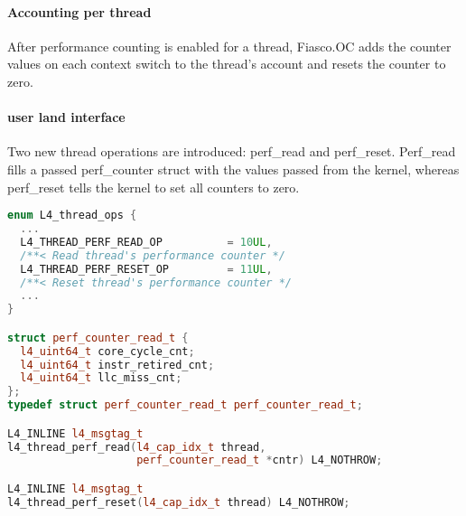\paragraph{Accounting per thread}
After performance counting is enabled for a thread,
Fiasco.OC adds the counter values on each context switch to the thread's
account and resets the counter to zero.


\paragraph{user land interface}
Two new thread operations are introduced: perf\_read and perf\_reset.
Perf\_read fills a passed perf\_counter struct with the values passed from the
kernel, whereas perf\_reset tells the kernel to set all counters to zero.

\begin{lstlisting}[language=c++]
enum L4_thread_ops {
  ...
  L4_THREAD_PERF_READ_OP	      = 10UL,
  /**< Read thread's performance counter */
  L4_THREAD_PERF_RESET_OP	      =	11UL,
  /**< Reset thread's performance counter */
  ...
}

struct perf_counter_read_t {
  l4_uint64_t core_cycle_cnt;
  l4_uint64_t instr_retired_cnt;
  l4_uint64_t llc_miss_cnt;
};
typedef struct perf_counter_read_t perf_counter_read_t;

L4_INLINE l4_msgtag_t
l4_thread_perf_read(l4_cap_idx_t thread,
                    perf_counter_read_t *cntr) L4_NOTHROW;

L4_INLINE l4_msgtag_t
l4_thread_perf_reset(l4_cap_idx_t thread) L4_NOTHROW;
\end{lstlisting}
